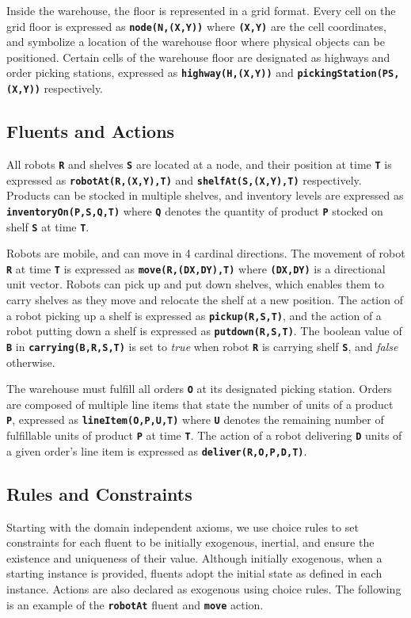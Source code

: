 \documentclass[letterpaper]{article}
\newcommand{\ct}[1]{\texttt{\textbf{#1}}}
\begin{document}
Inside the warehouse, the floor is represented in a grid format. Every cell on the grid floor is expressed as \ct{node(N,(X,Y))} where \ct{(X,Y)} are the cell coordinates, and symbolize a location of the warehouse floor where physical objects can be positioned. Certain cells of the warehouse floor are designated as highways and order picking stations, expressed as \ct{highway(H,(X,Y))} and \ct{pickingStation(PS,(X,Y))} respectively.

\subsection{Fluents and Actions}

All robots \ct{R} and shelves \ct{S} are located at a node, and their position at time \ct{T} is expressed as \ct{robotAt(R,(X,Y),T)} and \ct{shelfAt(S,(X,Y),T)} respectively. Products can be stocked in multiple shelves, and inventory levels are expressed as \ct{inventoryOn(P,S,Q,T)} where \ct{Q} denotes the quantity of product \ct{P} stocked on shelf \ct{S} at time \ct{T}.

Robots are mobile, and can move in 4 cardinal directions. The movement of robot \ct{R} at time \ct{T} is expressed as \ct{move(R,(DX,DY),T)} where \ct{(DX,DY)} is a directional unit vector. Robots can pick up and put down shelves, which enables them to carry shelves as they move and relocate the shelf at a new position. The action of a robot picking up a shelf is expressed as \ct{pickup(R,S,T)}, and the action of a robot putting down a shelf is expressed as \ct{putdown(R,S,T)}. The boolean value of \ct{B} in \ct{carrying(B,R,S,T)} is set to \emph{true} when robot \ct{R} is carrying shelf \ct{S}, and \emph{false} otherwise.

The warehouse must fulfill all orders \ct{O} at its designated picking station. Orders are composed of multiple line items that state the number of units of a product \ct{P}, expressed as \ct{lineItem(O,P,U,T)} where \ct{U} denotes the remaining number of fulfillable units of product \ct{P} at time \ct{T}. The action of a robot delivering \ct{D} units of a given order's line item is expressed as \ct{deliver(R,O,P,D,T)}.

\subsection{Rules and Constraints}

Starting with the domain independent axioms, we use choice rules to set constraints for each fluent to be initially exogenous, inertial, and ensure the existence and uniqueness of their value. Although initially exogenous, when a starting instance is provided, fluents adopt the initial state as defined in each instance. Actions are also declared as exogenous using choice rules. The following is an example of the \ct{robotAt} fluent and \ct{move} action.
\end{document}
